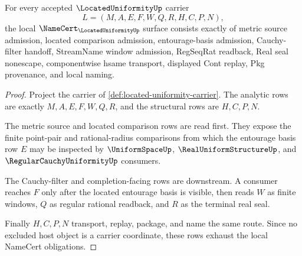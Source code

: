\begin{theorem}
\label{thm:located-uniformity-namecert-obligations}
For every accepted $\LocatedUniformityUp$ carrier
$$
L=(M,A,E,F,W,Q,R,H,C,P,N),
$$
the local $\NameCert_{\LocatedUniformityUp}$ surface consists exactly of metric
source admission, located comparison admission, entourage-basis admission,
Cauchy-filter handoff, StreamName window admission, RegSeqRat readback, Real
seal nonescape, componentwise hsame transport, displayed Cont replay, Pkg
provenance, and local naming.
\end{theorem}
\begin{proof}
Project the carrier of \autoref{def:located-uniformity-carrier}. The analytic
rows are exactly $M,A,E,F,W,Q,R$, and the structural rows are $H,C,P,N$.

The metric source and located comparison rows are read first. They expose the
finite point-pair and rational-radius comparisons from which the entourage
basis row $E$ may be inspected by $\UniformSpaceUp$,
$\RealUniformStructureUp$, and $\RegularCauchyUniformityUp$ consumers.

The Cauchy-filter and completion-facing rows are downstream. A consumer reaches
$F$ only after the located entourage basis is visible, then reads $W$ as finite
windows, $Q$ as regular rational readback, and $R$ as the terminal real seal.

Finally $H,C,P,N$ transport, replay, package, and name the same route. Since no
excluded host object is a carrier coordinate, these rows exhaust the local
NameCert obligations.
\end{proof}

